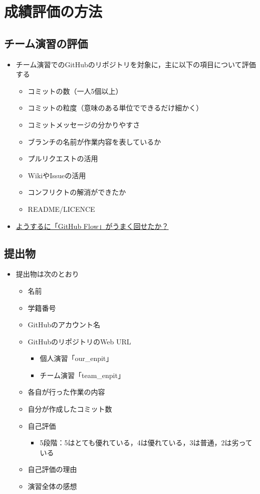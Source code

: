 \documentclass[a4paper,twoside,twocolumn]{bxjsarticle}
\begin{document}
\section{成績評価の方法}
\label{sec-5}
\subsection{チーム演習の評価}
\label{sec-5-1}
\begin{itemize}
\item チーム演習でのGitHubのリポジトリを対象に，主に以下の項目について評価する
\begin{itemize}
\item コミットの数（一人5個以上）
\item コミットの粒度（意味のある単位でできるだけ細かく）
\item コミットメッセージの分かりやすさ
\item ブランチの名前が作業内容を表しているか
\item プルリクエストの活用
\item WikiやIssueの活用
\item コンフリクトの解消ができたか
\item README/LICENCE
\end{itemize}
\item \uline{ようするに「GitHub Flow」がうまく回せたか？}
\end{itemize}

\subsection{提出物}
\label{sec-5-2}
\begin{itemize}
\item 提出物は次のとおり
\begin{itemize}
\item 名前
\item 学籍番号
\item GitHubのアカウント名
\item GitHubのリポジトリのWeb URL
\begin{itemize}
\item 個人演習「our\_enpit」
\item チーム演習「team\_enpit」
\end{itemize}
\item 各自が行った作業の内容
\item 自分が作成したコミット数
\item 自己評価
\begin{itemize}
\item 5段階：5はとても優れている，4は優れている，3は普通，2は劣っている
\end{itemize}
\item 自己評価の理由
\item 演習全体の感想
\end{itemize}
\end{itemize}
\end{document}
